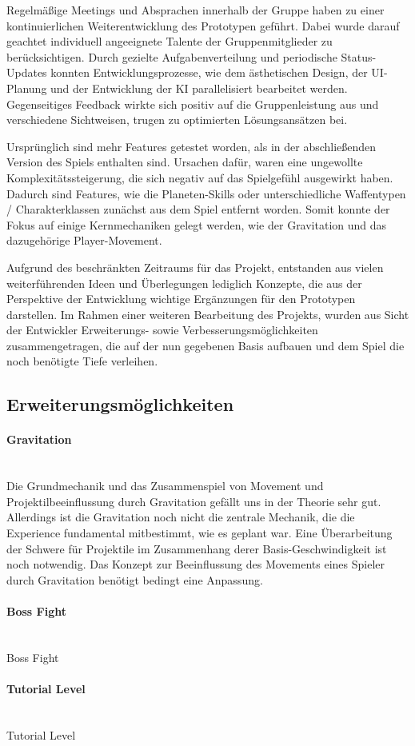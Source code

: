 \documentclass[11pt]{scrartcl}
\newcommand{\lbparagraph}[1]{\paragraph*{#1}\mbox{}\\}
\begin{document}
Regelmäßige Meetings und Absprachen innerhalb der Gruppe haben zu einer kontinuierlichen
Weiterentwicklung des Prototypen geführt. Dabei wurde darauf geachtet individuell
angeeignete Talente der Gruppenmitglieder zu berücksichtigen. Durch gezielte
Aufgabenverteilung und periodische Status-Updates konnten Entwicklungsprozesse, wie dem
ästhetischen Design, der UI-Planung und der Entwicklung der KI parallelisiert bearbeitet
werden. Gegenseitiges Feedback wirkte sich positiv auf die Gruppenleistung aus und
verschiedene Sichtweisen, trugen zu optimierten Lösungsansätzen bei.

Ursprünglich sind mehr Features getestet worden, als in der abschließenden Version des
Spiels enthalten sind. Ursachen dafür, waren eine ungewollte Komplexitäts\-stei\-ge\-rung,
die sich negativ auf das Spielgefühl ausgewirkt haben. Dadurch sind Features, wie die
Planeten-Skills oder unterschiedliche Waffentypen / Charakterklassen zunächst aus dem
Spiel entfernt worden. Somit konnte der Fokus auf einige Kernmechaniken gelegt werden, wie
der Gravitation und das dazugehörige Player-Movement.

Aufgrund des beschränkten Zeitraums für das Projekt, entstanden aus vielen weiterführenden
Ideen und Überlegungen lediglich Konzepte, die aus der Perspektive der Entwicklung
wichtige Ergänzungen für den Prototypen darstellen. Im Rahmen einer weiteren Bearbeitung
des Projekts, wurden aus Sicht der Entwickler Erweiterungs- sowie
Verbesserungsmöglichkeiten zusammengetragen, die auf der nun gegebenen Basis aufbauen und
dem Spiel die noch benötigte Tiefe verleihen.

\subsection{Erweiterungsmöglichkeiten}
\label{subsec:improvements}

\lbparagraph{Gravitation}
Die Grundmechanik und das Zusammenspiel von Movement und Projektilbeeinflussung durch
Gravitation gefällt uns in der Theorie sehr gut. Allerdings ist die Gravitation noch nicht
die zentrale Mechanik, die die Experience fundamental mitbestimmt, wie es geplant war.
Eine Überarbeitung der Schwere für Projektile im Zusammenhang derer Basis-Geschwindigkeit
ist noch notwendig. Das Konzept zur Beeinflussung des Movements eines Spieler durch
Gravitation benötigt bedingt eine Anpassung.

\lbparagraph{Boss Fight}
Boss Fight

\lbparagraph{Tutorial Level}
Tutorial Level
\end{document}
